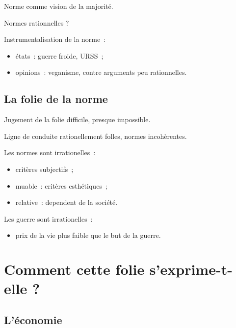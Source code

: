 \documentclass{beamer}
\begin{document}
\begin{frame}
	Norme comme vision de la majorité.
	
	Normes rationnelles ?
\end{frame}

\begin{frame}
	Instrumentalisation de la norme~:
	\begin{itemize}
	 \item états~: guerre froide, URSS~;
	 \item opinions~: veganisme, contre arguments peu rationnelles.
	\end{itemize}
\end{frame}

\subsection{La folie de la norme} %

\begin{frame}
	Jugement de la folie difficile, presque impossible.

	Ligne de conduite rationellement folles, normes incohèrentes.
\end{frame}

\begin{frame}
	Les normes sont irrationelles~:
	\begin{itemize}
	 \item critères subjectifs~;
	 \item muable~: critères esthétiques~;
	 \item relative~: dependent de la société.
	\end{itemize}
\end{frame}

\begin{frame}
	Les guerre sont irrationelles~:
	\begin{itemize}
	 \item prix de la vie plus faible que le but de la guerre.
	\end{itemize}
\end{frame}


\section{Comment cette folie s'exprime-t-elle ?}

\subsection{L'économie}
\end{document}

